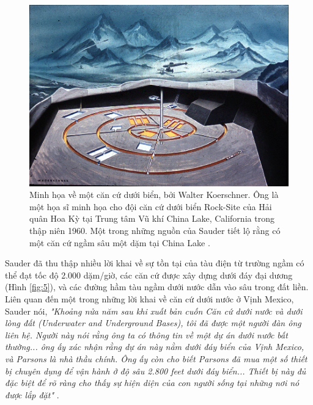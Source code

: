 \begin{figure}[t]
\begin{center}
   \includegraphics[width=1\linewidth]{undersea.jpg}
\end{center}
   \caption{Minh họa về một căn cứ dưới biển, bởi Walter Koerschner. Ông là một họa sĩ minh họa cho đội căn cứ dưới biển Rock-Site của Hải quân Hoa Kỳ tại Trung tâm Vũ khí China Lake, California trong thập niên 1960. Một trong những nguồn của Sauder tiết lộ rằng có một căn cứ ngầm sâu một dặm tại China Lake \cite{22,23}.}
\label{fig:5}
\label{fig:onecol}
\end{figure}

Sauder đã thu thập nhiều lời khai về sự tồn tại của tàu điện từ trường ngầm có thể đạt tốc độ 2.000 dặm/giờ, các căn cứ được xây dựng dưới đáy đại dương (Hình \ref{fig:5}), và các đường hầm tàu ngầm dưới nước dẫn vào sâu trong đất liền. Liên quan đến một trong những lời khai về căn cứ dưới nước ở Vịnh Mexico, Sauder nói, \textit{"Khoảng nửa năm sau khi xuất bản cuốn Căn cứ dưới nước và dưới lòng đất (Underwater and Underground Bases), tôi đã được một người đàn ông liên hệ. Người này nói rằng ông ta có thông tin về một dự án dưới nước bất thường... ông ấy xác nhận rằng dự án này nằm dưới đáy biển của Vịnh Mexico, và Parsons là nhà thầu chính. Ông ấy còn cho biết Parsons đã mua một số thiết bị chuyên dụng để vận hành ở độ sâu 2.800 feet dưới đáy biển... Thiết bị này đủ đặc biệt để rõ ràng cho thấy sự hiện diện của con người sống tại những nơi nó được lắp đặt"} \cite{22}.

